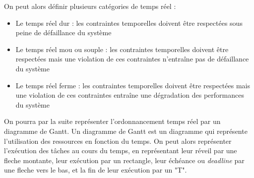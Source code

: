 On peut alors définir plusieurs catégories de temps réel :
\begin{itemize}
    \item Le temps réel dur : les contraintes temporelles doivent être respectées sous peine de défaillance du système
    \item Le temps réel mou ou souple : les contraintes temporelles doivent être respectées mais une violation de ces contraintes n'entraîne pas de défaillance du système
    \item Le temps réel ferme : les contraintes temporelles doivent être respectées mais une violation de ces contraintes entraîne une dégradation des performances du système
\end{itemize}


On pourra par la suite représenter l'ordonnancement temps réel par un diagramme de Gantt. Un diagramme de Gantt est un diagramme qui représente l'utilisation des ressources en fonction du temps. On peut alors représenter l'exécution des tâches au cours du temps, en représentant leur réveil par une fleche montante, leur exécution par un rectangle, leur échéance ou \textit{deadline} par une fleche vers le bas, et la fin de leur exécution par un "T". 

